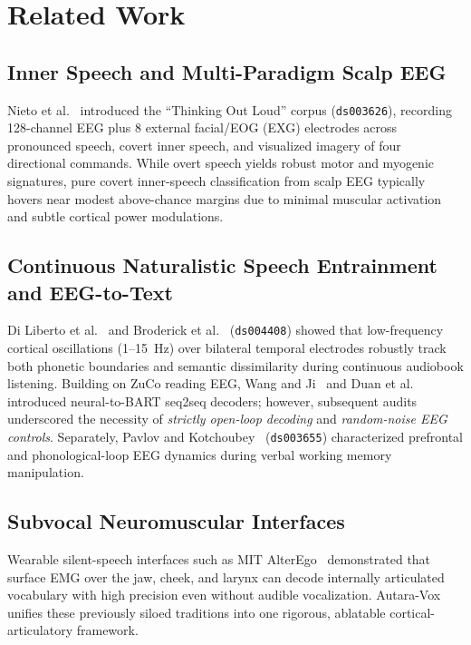 \documentclass[journal]{IEEEtran}
\begin{document}
\section{Related Work}
\subsection{Inner Speech and Multi-Paradigm Scalp EEG}
Nieto et al.~\cite{nieto2022thinking} introduced the ``Thinking Out Loud'' corpus (\texttt{ds003626}), recording 128-channel EEG plus 8 external facial/EOG (EXG) electrodes across pronounced speech, covert inner speech, and visualized imagery of four directional commands. While overt speech yields robust motor and myogenic signatures, pure covert inner-speech classification from scalp EEG typically hovers near modest above-chance margins due to minimal muscular activation and subtle cortical power modulations.

\subsection{Continuous Naturalistic Speech Entrainment and EEG-to-Text}
Di Liberto et al.~\cite{diliberto2015low} and Broderick et al.~\cite{broderick2018electrophysiological} (\texttt{ds004408}) showed that low-frequency cortical oscillations (1--15~Hz) over bilateral temporal electrodes robustly track both phonetic boundaries and semantic dissimilarity during continuous audiobook listening. Building on ZuCo reading EEG, Wang and Ji~\cite{wang2022open} and Duan et al.~\cite{duan2023dewave} introduced neural-to-BART seq2seq decoders; however, subsequent audits~\cite{jo2024are} underscored the necessity of \emph{strictly open-loop decoding} and \emph{random-noise EEG controls}. Separately, Pavlov and Kotchoubey~\cite{pavlov2020eeg} (\texttt{ds003655}) characterized prefrontal and phonological-loop EEG dynamics during verbal working memory manipulation.

\subsection{Subvocal Neuromuscular Interfaces}
Wearable silent-speech interfaces such as MIT AlterEgo~\cite{kapur2018alterego} demonstrated that surface EMG over the jaw, cheek, and larynx can decode internally articulated vocabulary with high precision even without audible vocalization. Autara-Vox unifies these previously siloed traditions into one rigorous, ablatable cortical-articulatory framework.
\end{document}
